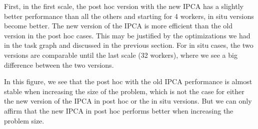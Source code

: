 First, in the first scale, the post hoc version with the new IPCA has a slightly better performance than all the others and starting for 4 workers, in situ versions become better. 
The new version of the IPCA is more efficient than the old version in the post hoc cases. This may be justified by the optimizations we had in the task graph and discussed in the  previous section. 
For in situ cases, the two versions are comparable until the last scale (32 workers), where we see a big difference between the two versions.  

In this figure, we see that the post hoc with the old IPCA performance is almost stable when increasing the size of the problem, which is not the case for either the new version of the IPCA in post hoc or the in situ versions. 
But we can only affirm that the new IPCA in post hoc performs better when increasing the problem size. 


